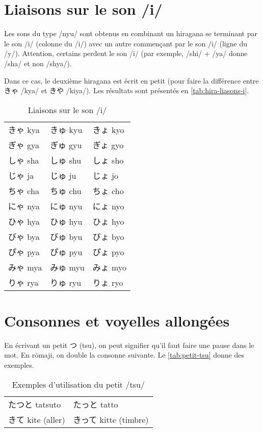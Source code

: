 \documentclass[a4paper,10pt,french,openany]{memoir}
\begin{document}
\section{Liaisons sur le son /i/}

Les sons du type /nyu/ sont obtenus en combinant un hiragana se terminant par le son /i/ (colonne du /i/) avec un autre commençant par le son /i/ (ligne du /y/). Attention, certains perdent le son /i/ (par exemple, /shi/ + /ya/ donne /sha/ et non /shya/).

Dans ce cas, le deuxième hiragana est écrit en petit (pour faire la différence entre きゃ /kya/ et きや /kiya/). Les résultats sont présentés en \autoref{tab:hira-liasons-i}.

\begin{table}[htbp]
 \centering
 \begin{tabular}{lll}
  きゃ kya& きゅ kyu& きょ kyo\\
  ぎゃ gya& ぎゅ gyu& ぎょ gyo\\
  しゃ sha& しゅ shu& しょ sho\\
  じゃ ja & じゅ ju & じょ jo \\
  ちゃ cha& ちゅ chu& ちょ cho\\
  にゃ nya& にゅ nyu& にょ nyo\\
  ひゃ hya& ひゅ hyu& ひょ hyo\\
  びゃ bya& びゅ byu& びょ byo\\
  ぴゃ pya& ぴゅ pyu& ぴょ pyo\\
  みゃ mya& みゅ myu& みょ myo\\
  りゃ rya& りゅ ryu& りょ ryo\\
 \end{tabular}
 \caption{Liaisons sur le son /i/}
 \label{tab:hira-liasons-i}
\end{table}

\section{Consonnes et voyelles allongées}

En écrivant un petit つ (tsu), on peut signifier qu'il faut faire une pause dans le mot. En rōmaji, on double la consonne suivante. Le \autoref{tab:petit-tsu} donne des exemples.

\begin{table}[htbp]
 \centering
 \begin{tabular}{ll}
  たつと tatsuto & たっと tatto \\
  きて kite (aller) & きって kitte (timbre)
 \end{tabular}
 \caption{Exemples d'utilisation du petit /tsu/}
 \label{tab:petit-tsu}
\end{table}
\end{document}
